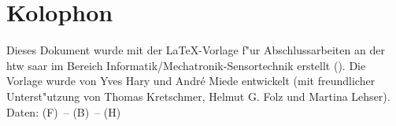 \pagestyle{empty}

\hfill

\vfill


\section*{Kolophon}
Dieses Dokument wurde mit der \LaTeX-Vorlage f"ur Abschlussarbeiten an der htw saar im Bereich Informatik/Mechatronik-Sensortechnik erstellt (\currentVersion). Die Vorlage wurde von Yves Hary und Andr\'e Miede entwickelt (mit freundlicher Unterst"utzung von Thomas Kretschmer, Helmut G. Folz und Martina Lehser). Daten: (F)\makeatletter\f@size\makeatother\ -- (B)\the\textwidth\ -- (H)\the\textheight\ 

